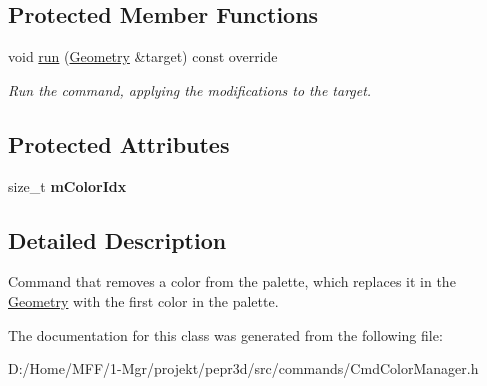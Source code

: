 \subsection*{Protected Member Functions}
\begin{DoxyCompactItemize}
\item 
\mbox{\label{classpepr3d_1_1_cmd_color_manager_remove_color_a6e668863ad50cac553cd0ace8dc9dc1b}} 
void \mbox{\hyperlink{classpepr3d_1_1_cmd_color_manager_remove_color_a6e668863ad50cac553cd0ace8dc9dc1b}{run}} (\mbox{\hyperlink{classpepr3d_1_1_geometry}{Geometry}} \&target) const override
\begin{DoxyCompactList}\small\item\em Run the command, applying the modifications to the target. \end{DoxyCompactList}\end{DoxyCompactItemize}
\subsection*{Protected Attributes}
\begin{DoxyCompactItemize}
\item 
\mbox{\label{classpepr3d_1_1_cmd_color_manager_remove_color_a84f93e44c66e8c5725561f64df3a5f3e}} 
size\+\_\+t {\bfseries m\+Color\+Idx}
\end{DoxyCompactItemize}


\subsection{Detailed Description}
Command that removes a color from the palette, which replaces it in the \mbox{\hyperlink{classpepr3d_1_1_geometry}{Geometry}} with the first color in the palette. 

The documentation for this class was generated from the following file\+:\begin{DoxyCompactItemize}
\item 
D\+:/\+Home/\+M\+F\+F/1-\/\+Mgr/projekt/pepr3d/src/commands/Cmd\+Color\+Manager.\+h\end{DoxyCompactItemize}
